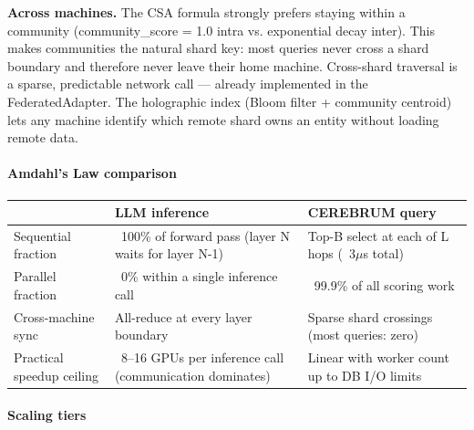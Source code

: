\documentclass[10pt,journal,compsoc]{IEEEtran}
\begin{document}
\textbf{Across machines.} The CSA formula strongly prefers staying within a community (community\_score = 1.0 intra vs. exponential decay inter). This makes communities the natural shard key: most queries never cross a shard boundary and therefore never leave their home machine. Cross-shard traversal is a sparse, predictable network call — already implemented in the FederatedAdapter. The holographic index (Bloom filter + community centroid) lets any machine identify which remote shard owns an entity without loading remote data.

\paragraph{Amdahl's Law comparison}

\begin{center}
{\footnotesize
\begin{tabularx}{\columnwidth}{|>{\raggedright\arraybackslash}X|>{\raggedright\arraybackslash}X|>{\raggedright\arraybackslash}X|}
\hline
 & LLM inference & CEREBRUM query \\ \hline
Sequential fraction & ~100\% of forward pass (layer N waits for layer N-1) & Top-B select at each of L hops (~3$\mu$s total) \\ \hline
Parallel fraction & ~0\% within a single inference call & ~99.9\% of all scoring work \\ \hline
Cross-machine sync & All-reduce at every layer boundary & Sparse shard crossings (most queries: zero) \\ \hline
Practical speedup ceiling & ~8–16 GPUs per inference call (commu\-nication dominates) & Linear with worker count up to DB I/O limits \\ \hline
\end{tabularx}
}
\end{center}

\paragraph{Scaling tiers}
\end{document}

